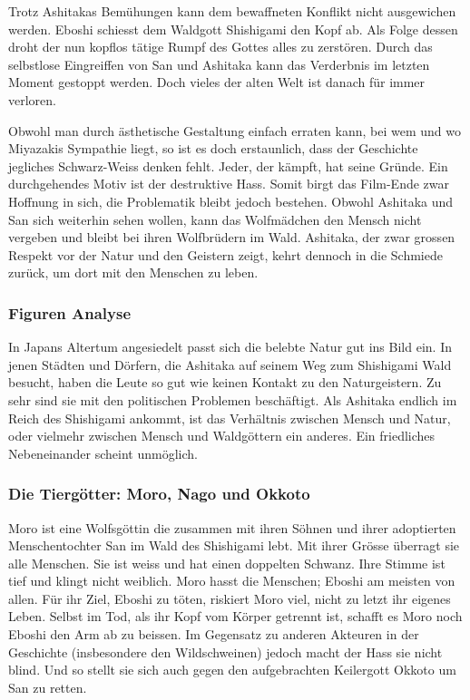 Trotz Ashitakas Bemühungen kann dem bewaffneten Konflikt nicht ausgewichen werden. Eboshi schiesst dem Waldgott Shishigami den Kopf ab. Als Folge dessen droht der nun kopflos tätige Rumpf des Gottes alles zu zerstören. Durch das selbstlose Eingreiffen von San und Ashitaka kann das Verderbnis im letzten Moment gestoppt werden. Doch vieles der alten Welt ist danach für immer verloren.

Obwohl man durch ästhetische Gestaltung einfach erraten kann, bei wem und wo Miyazakis Sympathie liegt, so ist es doch erstaunlich, dass der Geschichte jegliches Schwarz-Weiss denken fehlt. Jeder, der kämpft, hat seine Gründe. Ein durchgehendes Motiv ist der destruktive Hass. Somit birgt das Film-Ende zwar Hoffnung in sich, die Problematik bleibt jedoch bestehen. 
Obwohl Ashitaka und San sich weiterhin sehen wollen, kann das Wolfmädchen den Mensch nicht vergeben und bleibt bei ihren Wolfbrüdern im Wald. Ashitaka, der zwar grossen Respekt vor der Natur und den Geistern zeigt, kehrt dennoch in die Schmiede zurück, um dort mit den Menschen zu leben.  

\subsubsection{Figuren Analyse}
In Japans Altertum angesiedelt passt sich die belebte Natur gut ins Bild ein. In jenen Städten und Dörfern, die Ashitaka auf seinem Weg zum Shishigami Wald besucht, haben die Leute so gut wie keinen Kontakt zu den Naturgeistern. Zu sehr sind sie mit den politischen Problemen beschäftigt. Als Ashitaka endlich im Reich des Shishigami ankommt, ist das Verhältnis zwischen Mensch und Natur, oder vielmehr zwischen Mensch und Waldgöttern ein anderes. Ein friedliches Nebeneinander scheint unmöglich. 

\subsubsection*{Die Tiergötter: Moro, Nago und Okkoto}
Moro ist eine Wolfsgöttin die zusammen mit ihren Söhnen und ihrer adoptierten Menschentochter San im Wald des Shishigami lebt. Mit ihrer Grösse überragt sie alle Menschen. Sie ist weiss und hat einen doppelten Schwanz. Ihre Stimme ist tief und klingt nicht weiblich. Moro hasst die Menschen; Eboshi am meisten von allen. Für ihr Ziel, Eboshi zu töten, riskiert Moro viel, nicht zu letzt ihr eigenes Leben. Selbst im Tod, als ihr Kopf vom Körper getrennt ist, schafft es Moro noch Eboshi den Arm ab zu beissen. Im Gegensatz zu anderen Akteuren in der Geschichte (insbesondere den Wildschweinen) jedoch macht der Hass sie nicht blind. Und so stellt sie sich auch gegen den aufgebrachten Keilergott Okkoto um San zu retten.

